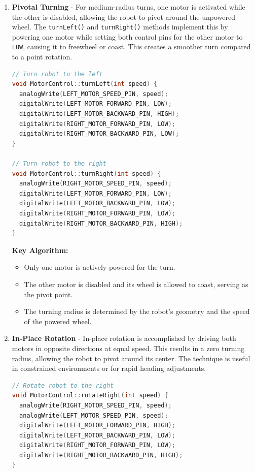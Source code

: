 \documentclass[conference]{IEEEtran}
\begin{document}
\begin{enumerate}[label=\alph*)]
\item \textbf{Pivotal Turning} - For medium-radius turns, one motor is activated while the other is disabled, allowing the robot to pivot around the unpowered wheel. The \verb|turnLeft()| and \verb|turnRight()| methods implement this by powering one motor while setting both control pins for the other motor to \verb|LOW|, causing it to freewheel or coast. This creates a smoother turn compared to a point rotation.

\begin{lstlisting}[language=C++, caption=Single-wheel pivot turn functions]
// Turn robot to the left
void MotorControl::turnLeft(int speed) {
  analogWrite(LEFT_MOTOR_SPEED_PIN, speed);
  digitalWrite(LEFT_MOTOR_FORWARD_PIN, LOW);
  digitalWrite(LEFT_MOTOR_BACKWARD_PIN, HIGH);
  digitalWrite(RIGHT_MOTOR_FORWARD_PIN, LOW);
  digitalWrite(RIGHT_MOTOR_BACKWARD_PIN, LOW);
}

// Turn robot to the right
void MotorControl::turnRight(int speed) {
  analogWrite(RIGHT_MOTOR_SPEED_PIN, speed);
  digitalWrite(LEFT_MOTOR_FORWARD_PIN, LOW);
  digitalWrite(LEFT_MOTOR_BACKWARD_PIN, LOW);
  digitalWrite(RIGHT_MOTOR_FORWARD_PIN, LOW);
  digitalWrite(RIGHT_MOTOR_BACKWARD_PIN, HIGH);
}

\end{lstlisting}

\textbf{Key Algorithm:}
\begin{itemize}
    \item Only one motor is actively powered for the turn.
    \item The other motor is disabled and its wheel is allowed to coast, serving as the pivot point.
    \item The turning radius is determined by the robot's geometry and the speed of the powered wheel.
\end{itemize}

\item \textbf{In-Place Rotation} - In-place rotation is accomplished by driving both motors in opposite directions at equal speed. This results in a zero turning radius, allowing the robot to pivot around its center. The technique is useful in constrained environments or for rapid heading adjustments.

\begin{lstlisting}[language=C++, caption=Counter-rotational in-place turning]
// Rotate robot to the right
void MotorControl::rotateRight(int speed) {
  analogWrite(RIGHT_MOTOR_SPEED_PIN, speed);
  analogWrite(LEFT_MOTOR_SPEED_PIN, speed);
  digitalWrite(LEFT_MOTOR_FORWARD_PIN, HIGH);
  digitalWrite(LEFT_MOTOR_BACKWARD_PIN, LOW);
  digitalWrite(RIGHT_MOTOR_FORWARD_PIN, LOW);
  digitalWrite(RIGHT_MOTOR_BACKWARD_PIN, HIGH);
}


\end{lstlisting}
\end{enumerate}
\end{document}
